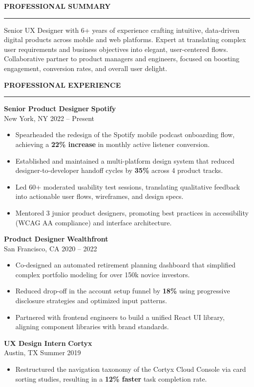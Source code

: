 \documentclass[10pt,letterpaper]{article}
\newcommand{\cvsection}[1]{%
  \vspace{3.5mm}%
  \noindent
  {\large\bfseries\color{accent}\MakeUppercase{#1}}\\[-1.5ex]%
  {\color{accent!30}\rule{\linewidth}{1.5pt}}%
  \vspace{2mm}%
}
\newcommand{\experienceitem}[4]{%
  \vspace{2.5mm}%
  \noindent
  \begin{minipage}{\linewidth}
    {\textbf{#1} \hfill \small\color{accent}\textbf{#2}} \\
    {\small\color{darkneutral}#3 \hfill \small\color{muted}#4}
  \end{minipage}%
  \vspace{1.5mm}%
}
\begin{document}
\begin{minipage}[t]{0.64\textwidth}
  \vspace{0pt}

  \cvsection{Professional Summary}
  \small
  Senior UX Designer with 6+ years of experience crafting intuitive, data-driven digital products across mobile and web platforms. Expert at translating complex user requirements and business objectives into elegant, user-centered flows. Collaborative partner to product managers and engineers, focused on boosting engagement, conversion rates, and overall user delight.

  \cvsection{Professional Experience}
  
  \experienceitem{Senior Product Designer}{Spotify}{New York, NY}{2022 -- Present}
  \begin{itemize}[leftmargin=3.5mm, nosep, itemsep=2.5pt]
    \item Spearheaded the redesign of the Spotify mobile podcast onboarding flow, achieving a \textbf{22\% increase} in monthly active listener conversion.
    \item Established and maintained a multi-platform design system that reduced designer-to-developer handoff cycles by \textbf{35\%} across 4 product tracks.
    \item Led 60+ moderated usability test sessions, translating qualitative feedback into actionable user flows, wireframes, and design specs.
    \item Mentored 3 junior product designers, promoting best practices in accessibility (WCAG AA compliance) and interface architecture.
  \end{itemize}

  \experienceitem{Product Designer}{Wealthfront}{San Francisco, CA}{2020 -- 2022}
  \begin{itemize}[leftmargin=3.5mm, nosep, itemsep=2.5pt]
    \item Co-designed an automated retirement planning dashboard that simplified complex portfolio modeling for over 150k novice investors.
    \item Reduced drop-off in the account setup funnel by \textbf{18\%} using progressive disclosure strategies and optimized input patterns.
    \item Partnered with frontend engineers to build a unified React UI library, aligning component libraries with brand standards.
  \end{itemize}

  \experienceitem{UX Design Intern}{Cortyx}{Austin, TX}{Summer 2019}
  \begin{itemize}[leftmargin=3.5mm, nosep, itemsep=2.5pt]
    \item Restructured the navigation taxonomy of the Cortyx Cloud Console via card sorting studies, resulting in a \textbf{12\% faster} task completion rate.
  \end{itemize}


\end{minipage}
\end{document}
